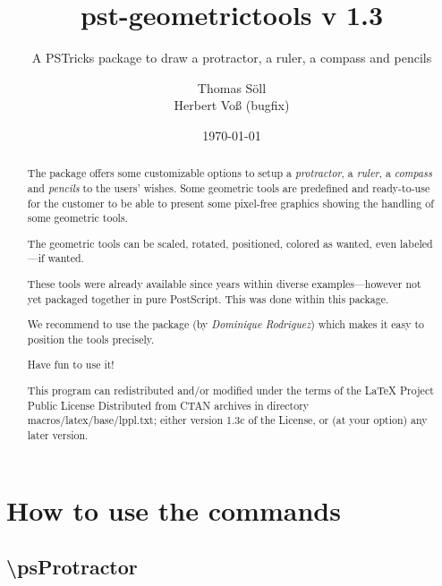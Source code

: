 \documentclass[fontsize=11pt,english,BCOR=10mm,DIV=12,bibliography=totoc,parskip=false,headings=small,
    headinclude=false,footinclude=false,oneside]{pst-doc}
\begin{document}
\title{pst-geometrictools v 1.3}
\subtitle{A PSTricks package to draw a protractor, a ruler, a compass and pencils}
\author{Thomas Söll\\Herbert Voß (bugfix)}
\date{\today}

\settitle

\tableofcontents

\begin{abstract}
The package  offers some customizable options to setup a \emph{protractor}, a \emph{ruler}, 
a \emph{compass} and \emph{pencils} to the users'  wishes. Some geometric tools are predefined
 and ready-to-use for the customer to be able to present some pixel-free graphics showing the handling of some geometric tools.

The geometric tools can be scaled, rotated, positioned, colored as wanted, even labeled---if wanted.

These tools were already available since years within diverse examples---however not yet packaged together in pure PostScript. This was done within this package.

We recommend to use the package  (by \textit{Dominique Rodriguez}) which makes it easy to position the tools precisely.

Have fun to use it!

\bigskip
This program can redistributed and/or modified under the terms of the LaTeX Project Public License Distributed from CTAN archives in directory macros/latex/base/lppl.txt; 
either version 1.3c of the License, or (at your option) any later version.
\end{abstract}



\clearpage


\section{How to use the commands}

\subsection{\textbackslash psProtractor}

\begin{BDef}
\OptArgs{}\\
\OptArgs{}
\end{BDef}
\end{document}
